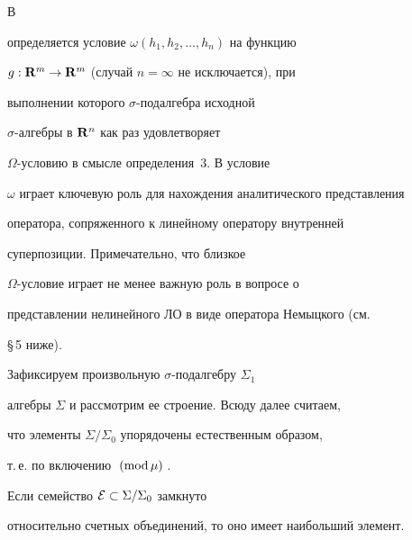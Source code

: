 \begin{note}


В \cite{20}


определяется условие $\omega(h_1,h_2,\dotsc,h_n)$ на функцию


$g:{{\bold R}}^m\to{{\bold R}}^m$ (случай $n=\infty$ не исключается), при


выполнении которого $\sigma$-по\-дал\-геб\-ра исходной


$\sigma$-ал\-геб\-ры в ${{\bold R}}^n$ как раз удовлетворяет


$\Omega$-ус\-ло\-вию в смысле определения~3. В \cite{20} условие


$\omega$ играет ключевую роль для нахождения аналитического представления


оператора, сопряженного к линейному оператору внутренней


суперпозиции. Примечательно, что близкое


$\Omega$-ус\-ло\-вие играет не менее важную роль в вопросе о


представлении нелинейного ЛО в виде оператора Немыцкого (см.


\S\,5 ниже).


\end{note}





Зафиксируем произвольную $\sigma$-под\-ал\-геб\-ру $\Sigma_1$


алгебры $\Sigma$ и рассмотрим ее строение. Всюду далее считаем,


что элементы $\Sigma/\Sigma_0$ упорядочены естественным образом,


т.\,е. по включению $\;(\mathrm{mod}\,\mu)\;$.





\begin{lem}


Если семейство ${\cal E}\subset\Sigma/\Sigma_0$ замкнуто


относительно счетных объединений, то оно имеет наибольший элемент.


\end{lem}





